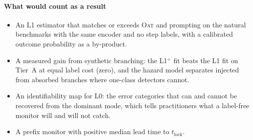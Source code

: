 \documentclass[10pt,a4paper]{article}
\begin{document}
\paragraph{What would count as a result}
\begin{itemize}[leftmargin=1.1em]
\item An L1 estimator that matches or exceeds \textsc{Oat} and prompting on the natural benchmarks with the same encoder and no step labels, with a calibrated outcome probability as a by-product.
\item A measured gain from synthetic branching: the L1$^{+}$ fit beats the L1 fit on Tier~A at equal label cost (zero), and the hazard model separates injected from absorbed branches where one-class detectors cannot.
\item An identifiability map for L0: the error categories that can and cannot be recovered from the dominant mode, which tells practitioners what a label-free monitor will and will not catch.
\item A prefix monitor with positive median lead time to $t_{\mathrm{lock}}$.
\end{itemize}

\clearpage

\end{document}
